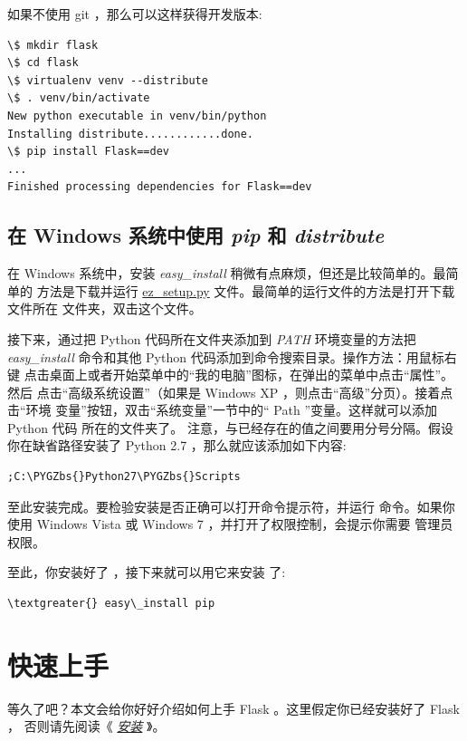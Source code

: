 \documentclass[a4paper,12pt]{sphinxmanual}
\def\PYGZbs{\char`\\}
\begin{document}
如果不使用 git ，那么可以这样获得开发版本:

\begin{Verbatim}[commandchars=\\\{\}]
\$ mkdir flask
\$ cd flask
\$ virtualenv venv --distribute
\$ . venv/bin/activate
New python executable in venv/bin/python
Installing distribute............done.
\$ pip install Flask==dev
...
Finished processing dependencies for Flask==dev
\end{Verbatim}


\section{在 Windows 系统中使用 \emph{pip} 和 \emph{distribute}}
\label{installation:windows-easy-install}\label{installation:windows-pip-distribute}
在 Windows 系统中，安装 \emph{easy\_install} 稍微有点麻烦，但还是比较简单的。最简单的
方法是下载并运行 \href{http://peak.telecommunity.com/dist/ez\_setup.py}{ez\_setup.py} 文件。最简单的运行文件的方法是打开下载文件所在
文件夹，双击这个文件。

接下来，通过把 Python 代码所在文件夹添加到 \emph{PATH} 环境变量的方法把
\emph{easy\_install} 命令和其他 Python 代码添加到命令搜索目录。操作方法：用鼠标右键
点击桌面上或者开始菜单中的“我的电脑”图标，在弹出的菜单中点击“属性”。然后
点击“高级系统设置”（如果是 Windows XP ，则点击“高级”分页）。接着点击“环境
变量”按钮，双击“系统变量”一节中的“ Path ”变量。这样就可以添加 Python 代码
所在的文件夹了。 注意，与已经存在的值之间要用分号分隔。假设你在缺省路径安装了
Python 2.7 ，那么就应该添加如下内容:

\begin{Verbatim}[commandchars=\\\{\}]
;C:\PYGZbs{}Python27\PYGZbs{}Scripts
\end{Verbatim}

至此安装完成。要检验安装是否正确可以打开命令提示符，并运行 
命令。如果你使用 Windows Vista 或 Windows 7 ，并打开了权限控制，会提示你需要
管理员权限。

至此，你安装好了  ，接下来就可以用它来安装  了:

\begin{Verbatim}[commandchars=\\\{\}]
\textgreater{} easy\_install pip
\end{Verbatim}


\chapter{快速上手}
\label{quickstart::doc}\label{quickstart:ez-setup-py}\label{quickstart:quickstart}\label{quickstart:id1}
等久了吧？本文会给你好好介绍如何上手 Flask 。这里假定你已经安装好了 Flask ，
否则请先阅读《 {\hyperref[installation:installation]{\emph{安装}}} 》。
\end{document}
